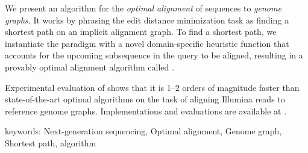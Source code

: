 	We present an algorithm for the \emph{optimal alignment} of sequences to
	\emph{genome graphs}. It works by phrasing the edit distance minimization
	task as finding a shortest path on an implicit alignment graph. To find a
	shortest path, we instantiate the \A paradigm with a novel domain-specific
	heuristic function that accounts for the upcoming subsequence in the query
	to be aligned, resulting in a provably optimal alignment algorithm called
	\astarix.
	
	\quad \quad Experimental evaluation of \astarix shows that it is 1--2
	orders of magnitude faster than state-of-the-art optimal algorithms on the
	task of aligning Illumina reads to reference genome graphs. Implementations
	and evaluations are available at \mbox{\astarixurl}.

	keywords: Next-generation sequencing, Optimal alignment, Genome graph,
	Shortest path, \A algorithm